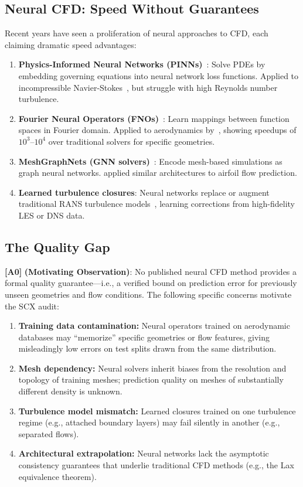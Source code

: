\documentclass[11pt,a4paper]{article}
\theoremstyle{definition}
\theoremstyle{remark}
\newcommand{\assumptionTag}[1]{\textsf{\textbf{[A#1]}}}
\begin{document}
\subsection{Neural CFD: Speed Without Guarantees}

Recent years have seen a proliferation of neural approaches to CFD, each claiming dramatic speed advantages:

\begin{enumerate}[label=(\roman*)]
    \item \textbf{Physics-Informed Neural Networks (PINNs)}~\citep{raissi2019physics}: Solve PDEs by embedding governing equations into neural network loss functions. Applied to incompressible Navier-Stokes~\citep{jin2021nsfnets}, but struggle with high Reynolds number turbulence.
    \item \textbf{Fourier Neural Operators (FNOs)}~\citep{li2020fourier}: Learn mappings between function spaces in Fourier domain. Applied to aerodynamics by~\citet{li2022learning}, showing speedups of $10^3$--$10^4$ over traditional solvers for specific geometries.
    \item \textbf{MeshGraphNets (GNN solvers)}~\citep{pfaff2020learning}: Encode mesh-based simulations as graph neural networks. \citet{thuerey2020deep} applied similar architectures to airfoil flow prediction.
    \item \textbf{Learned turbulence closures}: Neural networks replace or augment traditional RANS turbulence models~\citep{ling2016reynolds,duraisamy2019turbulence}, learning corrections from high-fidelity LES or DNS data.
\end{enumerate}

\subsection{The Quality Gap}

\assumptionTag{0} \textbf{(Motivating Observation)}: No published neural CFD method provides a formal quality guarantee---i.e., a verified bound on prediction error for previously unseen geometries and flow conditions.
The following specific concerns motivate the SCX audit:

\begin{enumerate}[label=(\roman*)]
    \item \textbf{Training data contamination:} Neural operators trained on aerodynamic databases may ``memorize'' specific geometries or flow features, giving misleadingly low errors on test splits drawn from the same distribution.
    \item \textbf{Mesh dependency:} Neural solvers inherit biases from the resolution and topology of training meshes; prediction quality on meshes of substantially different density is unknown.
    \item \textbf{Turbulence model mismatch:} Learned closures trained on one turbulence regime (e.g., attached boundary layers) may fail silently in another (e.g., separated flows).
    \item \textbf{Architectural extrapolation:} Neural networks lack the asymptotic consistency guarantees that underlie traditional CFD methods (e.g., the Lax equivalence theorem).
\end{enumerate}
\end{document}

